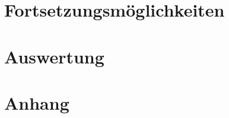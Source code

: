 \documentclass[11pt,a4paper]{article}
\begin{document}
\newpage
\section{Fortsetzungsmöglichkeiten}


\newpage
\section{Auswertung}

\newpage
\section{Anhang}
\end{document}
